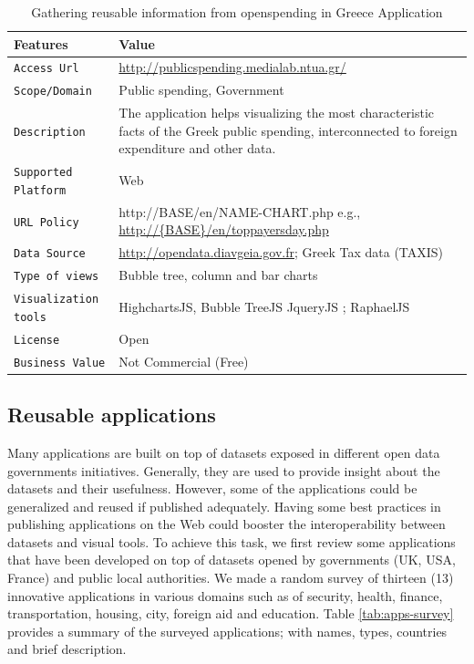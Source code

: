 \begin{table}[ht!b]
    \caption{Gathering reusable information from openspending in Greece Application} \label{tab:describeApps}
    \small
    \center
    \begin{tabularx}{\textwidth}{@{}lX@{}}
    \toprule
    \textbf{Features} & \textbf{Value}\\
    \toprule
    \texttt{Access Url }&	\url{http://publicspending.medialab.ntua.gr/}\\
    \midrule
    \texttt{Scope/Domain} &	Public spending, Government \\
    \midrule
    \texttt{Description} & The application helps visualizing the most characteristic facts of the Greek public spending, interconnected to foreign expenditure and other data. \\
    \midrule
    \texttt{Supported Platform} &	Web \\
    \midrule
    \texttt{URL Policy}   &  http://{BASE}/en/{NAME-CHART}.php e.g., \url{http://{BASE}/en/toppayersday.php} \\
    \midrule
    \texttt{Data Source}	& \url{http://opendata.diavgeia.gov.fr}; Greek Tax data (TAXIS) \\
    \midrule
\texttt{Type of views} & Bubble tree, column and bar charts \\
    \midrule
   \texttt{Visualization tools} &  HighchartsJS,  Bubble TreeJS JqueryJS ; RaphaelJS \\
   \midrule
  \texttt{License} & Open \\
    \midrule
\texttt{Business Value} & Not Commercial (Free) \\
    \bottomrule

    \end{tabularx}
    \end{table}

\subsection{Reusable applications} \label{sec:reusable}
Many applications are built on top of datasets exposed in different open data governments initiatives. Generally, they are used to provide insight about the datasets and their usefulness. However, some of the applications could be generalized and reused if published adequately. Having some best practices in publishing applications on the Web could booster the interoperability between datasets and visual tools. To achieve this task, we first review some applications that have been developed on top of datasets  opened by governments (UK, USA, France) and public local authorities. We made a random survey of thirteen (13) innovative applications \cite{deliverable2012a} in various domains such as of security, health, finance, transportation, housing, city, foreign aid and education. Table \ref{tab:apps-survey} provides a summary of the surveyed applications; with names, types, countries and brief description.

